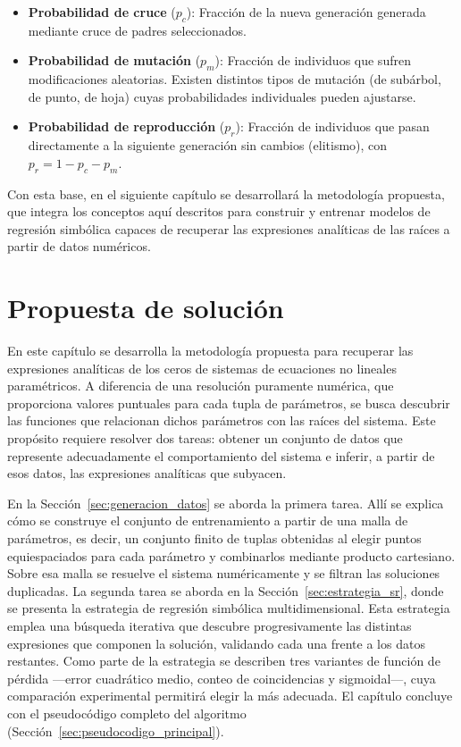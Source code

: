 \documentclass[12pt,a4paper]{article} \usepackage[utf8]{inputenc} \usepackage[spanish]{babel} \usepackage{amsmath, amssymb, amsthm} \usepackage{bm} \usepackage{float} \usepackage{longtable} \usepackage[hidelinks]{hyperref}
\begin{document}
\begin{itemize}
 \item \textbf{Probabilidad de cruce} (\(p_c\)): Fracción de la nueva generación generada mediante cruce de padres seleccionados.

 \item \textbf{Probabilidad de mutación} (\(p_m\)): Fracción de individuos que sufren modificaciones aleatorias. Existen distintos tipos de mutación (de subárbol, de punto, de hoja) cuyas probabilidades individuales pueden ajustarse.

 \item \textbf{Probabilidad de reproducción} (\(p_r\)): Fracción de individuos que pasan directamente a la siguiente generación sin cambios (elitismo), con \(p_r = 1 - p_c - p_m\).
\end{itemize}

\bigskip Con esta base, en el siguiente capítulo se desarrollará la metodología propuesta, que integra los conceptos aquí descritos para construir y entrenar modelos de regresión simbólica capaces de recuperar las expresiones analíticas de las raíces a partir de datos numéricos.

 \newpage

\section{Propuesta de solución}
\label{sec:propuesta}

En este capítulo se desarrolla la metodología propuesta para recuperar
las expresiones analíticas de los ceros de sistemas de ecuaciones no
lineales paramétricos. A diferencia de una resolución puramente
numérica, que proporciona valores puntuales para cada tupla de
parámetros, se busca descubrir las funciones que relacionan dichos
parámetros con las raíces del sistema. Este propósito requiere resolver
dos tareas: obtener un conjunto de datos que represente adecuadamente
el comportamiento del sistema e inferir, a partir de esos datos, las
expresiones analíticas que subyacen.

En la Sección~\ref{sec:generacion_datos} se aborda la primera tarea.
Allí se explica cómo se construye el conjunto de entrenamiento a partir de una malla de
parámetros, es decir, un conjunto finito de tuplas obtenidas al elegir
puntos equiespaciados para cada parámetro y combinarlos mediante
producto cartesiano. Sobre esa malla se resuelve el sistema
numéricamente y se filtran las soluciones duplicadas. La segunda tarea
se aborda en la Sección~\ref{sec:estrategia_sr}, donde se presenta la
estrategia de regresión simbólica multidimensional. Esta estrategia
emplea una búsqueda iterativa que descubre progresivamente las
distintas expresiones que componen la solución, validando cada una
frente a los datos restantes. Como parte de la estrategia se describen
tres variantes de función de pérdida —error cuadrático medio, conteo de
coincidencias y sigmoidal—, cuya comparación experimental
permitirá elegir la más adecuada. El capítulo concluye con el
pseudocódigo completo del algoritmo
(Sección~\ref{sec:pseudocodigo_principal}).
\end{document}
